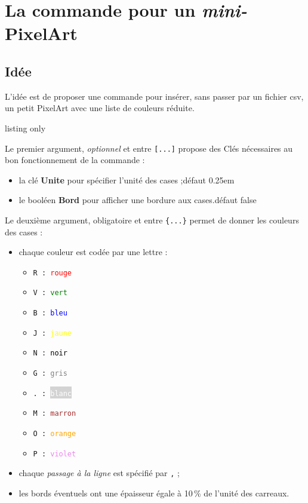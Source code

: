 \documentclass{article}
\newcommand\Cle[1]{{\bfseries\sffamily\textlangle #1\textrangle}}
\begin{document}
\newpage

\section{La commande pour un \textit{mini-}PixelArt}

\subsection{Idée}

L'idée est de proposer une commande pour insérer, sans passer par un fichier \textsf{csv}, un petit PixelArt avec une liste de couleurs réduite.

\begin{PresentationCode}{listing only}
\end{PresentationCode}

Le premier argument, \textit{optionnel} et entre \texttt{[...]} propose des \textsf{Clés} nécessaires au bon fonctionnement de la commande :

\begin{itemize}
	\item la clé \Cle{Unite} pour spécifier l'unité des cases ;\hfill{}défaut \textsf{0.25em}
	\item le booléen \Cle{Bord} pour afficher une bordure aux cases.\hfill{}défaut \textsf{false}
\end{itemize}

Le deuxième argument, obligatoire et entre \texttt{\{...\}} permet de donner les couleurs des cases :

\begin{itemize}
	\item chaque couleur est codée par une lettre :
	\begin{multicols}{5}
		\begin{itemize}
			\item \texttt{R : \textcolor{red}{rouge}}
			\item \texttt{V : \textcolor{green}{vert}}
			\item \texttt{B : \textcolor{blue}{bleu}}
			\item \texttt{J : \textcolor{yellow}{jaune}}
			\item \texttt{N : \textcolor{black}{noir}}
			\item \texttt{G : \textcolor{gray}{gris}}
			\item \texttt{. : \colorbox{lightgray}{\textcolor{white}{blanc}}}
			\item \texttt{M : \textcolor{brown}{marron}}
			\item \texttt{O : \textcolor{orange}{orange}}
			\item \texttt{P : \textcolor{violet}{violet}}
		\end{itemize}
	\end{multicols}
	\item chaque \textit{passage à la ligne} est spécifié par \texttt{,} ;
	\item les bords éventuels ont une épaisseur égale à 10\,\% de l'unité des carreaux.
\end{itemize}
\end{document}
